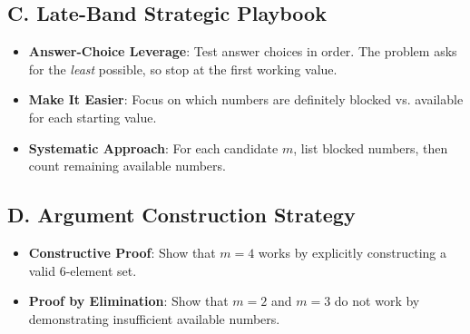\documentclass[12pt]{article}
\begin{document}
\begin{strategicbox}
\subsection*{C. Late-Band Strategic Playbook}
\begin{itemize}[leftmargin=*]
    \item \textbf{Answer-Choice Leverage}: Test answer choices in order. The problem asks for the \textit{least} possible, so stop at the first working value.
    
    \item \textbf{Make It Easier}: Focus on which numbers are definitely blocked vs. available for each starting value.
    
    \item \textbf{Systematic Approach}: For each candidate $m$, list blocked numbers, then count remaining available numbers.
\end{itemize}

\subsection*{D. Argument Construction Strategy}
\begin{itemize}[leftmargin=*]
    \item \textbf{Constructive Proof}: Show that $m = 4$ works by explicitly constructing a valid 6-element set.
    
    \item \textbf{Proof by Elimination}: Show that $m = 2$ and $m = 3$ do not work by demonstrating insufficient available numbers.
\end{itemize}
\end{strategicbox}
\end{document}
